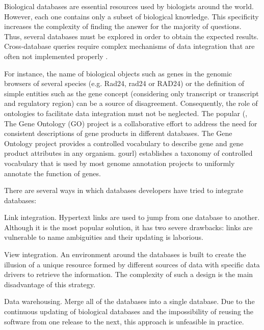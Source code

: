 Biological databases are essential resources used by biologists around the world. However, each one
contains only a subset of biological knowledge. This specificity increases the complexity of finding 
the answer for the majority of questions. Thus, several databases must be explored in order to obtain
the expected results. Cross-database queries require complex mechanisms of data integration that are
often not implemented properly \citep{stein:2003a}. 

For instance, the name of biological objects such as genes in the genomic browsers of several species 
(e.g. Rad24, rad24 or RAD24) or the definition of simple entities such as the gene concept 
(considering only transcript or transcript and regulatory region) can be a source of disagreement. 
Consequently, the role of ontologies to facilitate data integration must not be neglected. The 
popular \go{} 
(\citealp{tgoc:2000a}, %
    {\go{}}%
    {%
	 The Gene Ontology (GO) project is a collaborative effort to address the need for consistent 
	 descriptions of gene products in different databases. The Gene Ontology project provides a 
	 controlled vocabulary to describe gene and gene product attributes in any organism.
    }%
    {gourl}) 
establishes a taxonomy of controlled vocabulary that is used by most genome annotation projects
to uniformly annotate the function of genes.

\noindent There are several ways in which databases developers have tried to integrate databases:
\begin{mitemize}
\item
Link integration. Hypertext links are used to jump from one database to another. Although it is
the most popular solution, it has two severe drawbacks: links are vulnerable to name ambiguities and 
their updating is laborious.
\item
View integration. An environment around the databases is built to create the illusion of a unique
resource formed by different sources of data with specific data drivers to retrieve the information. 
The complexity of such a design is the main disadvantage of this strategy.
\item
Data warehousing. Merge all of the databases into a single database. Due to the continuous updating
of biological databases and the impossibility of reusing the software from one release to the next,
this approach is unfeasible in practice.
\end{mitemize}

